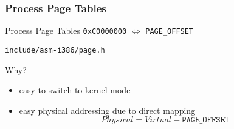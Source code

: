 \subsubsection{Process Page Tables}

\begin{frame}{Process Page Tables}
  \texttt{0xC0000000} $\Leftrightarrow$ \texttt{PAGE\_OFFSET}

  \begin{block}{\texttt{include/asm-i386/page.h}}
    \begin{center}
    \end{center}
  \end{block}
  \begin{center}
  \end{center}
  \begin{block}{Why?}
    \begin{itemize}
    \item easy to switch to kernel mode
    \item easy physical addressing due to direct mapping
      $$Physical = Virtual - \mathtt{PAGE\_OFFSET}$$
    \end{itemize}
  \end{block}
\end{frame}

